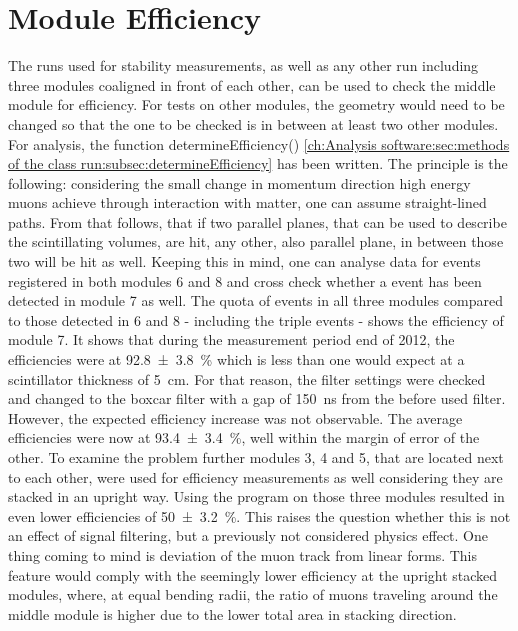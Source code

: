   \section{Module Efficiency}
  \label{ch:Analysis:sec:Module Efficiency}
  The runs used for stability measurements, as well as any other run including three modules coaligned in front of each other, can be used to check the middle module for efficiency. For tests on other modules, the geometry would need to be changed so that the one to be checked is in between at least two other modules.
  For analysis, the function determineEfficiency() \ref{ch:Analysis software:sec:methods of the class run:subsec:determineEfficiency}
  has been written.
  The principle is the following: considering the small change in momentum direction high energy muons achieve through interaction with matter, one can assume straight-lined paths. From that follows, that if two parallel planes, that can be used to describe the scintillating volumes, are hit, any other, also parallel plane, in between those two will be hit as well. Keeping this in mind, one can analyse data for events registered in both modules 6 and 8 and cross check whether a event has been detected in module 7 as well. The quota of events in all three modules compared to those detected in 6 and 8 -  including the triple events - shows the efficiency of module 7.
  It shows that during the measurement period end of 2012, the efficiencies were at  \SI{92.8\pm 3.8 }{\percent} which is less than one would expect at a scintillator thickness of \SI{5}{\centi\meter}.
  For that reason, the filter settings were checked and changed to the boxcar filter with a gap of \SI{150}{\ns} from the before used  filter. However, the expected efficiency increase was not observable. The average efficiencies were now at \SI{93.4 \pm 3.4}{\percent}, well within the margin of error of the other.
  To examine the problem further modules 3, 4 and 5, that are located next to each other, were used for efficiency measurements as well considering they are stacked in an upright way. Using the program on those three modules resulted in even lower efficiencies of \SI{50\pm 3.2}{\percent}. This raises the question whether this is not an effect of signal filtering, but a previously not considered physics effect. One thing coming to mind is deviation of the muon track from linear forms. This feature would comply with the seemingly lower efficiency at the upright stacked modules, where, at equal bending radii, the ratio of muons traveling around the middle module is higher due to the lower total area in stacking direction.
